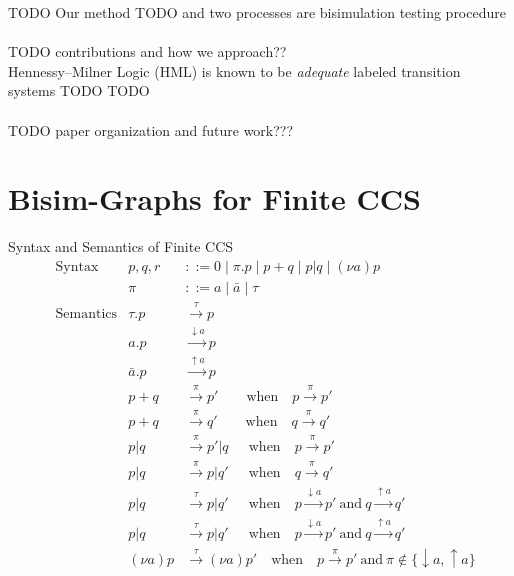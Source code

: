 \documentclass{llncs}
\begin{document}
TODO Our method TODO
and 
two processes are
bisimulation testing procedure


\paragraph{} TODO contributions and how we approach??\\
Hennessy--Milner Logic (HML) is known to be \emph{adequate}
labeled transition systems TODO TODO

\paragraph{} TODO paper organization and future work???

\section{Bisim-Graphs for Finite CCS} \label{sec:ccs}

Syntax and Semantics of Finite CCS
\begin{align*}
&\text{Syntax} &
p,q,r &::= 0 \mid \pi.p \mid p + q \mid p|q \mid (\nu a)p \\ &&
\pi &::= a \mid \bar{a} \mid \tau
\\
&\text{Semantics} &
\tau.p &\xrightarrow{\tau} p \\ &&
a.p &\xrightarrow{\downarrow a} p \\ &&
\bar{a}.p &\xrightarrow{\uparrow a} p \\ &&
p+q &\xrightarrow{\pi} p' \qquad\text{when}\quad p \xrightarrow{\pi} p' \\ &&
p+q &\xrightarrow{\pi} q' \qquad\text{when}\quad q \xrightarrow{\pi} q' \\ &&
p|q &\xrightarrow{\pi} p'|q ~~\quad\text{when}\quad p \xrightarrow{\pi} p' \\ &&
p|q &\xrightarrow{\pi} p|q' ~~\quad\text{when}\quad q \xrightarrow{\pi} q' \\ &&
p|q &\xrightarrow{\tau} p|q' ~~\quad\text{when}\quad
  p \xrightarrow{\downarrow a} p' ~\text{and}~
  q \xrightarrow{\uparrow a} q' \\ &&
p|q &\xrightarrow{\tau} p|q' ~~\quad\text{when}\quad
  p \xrightarrow{\downarrow a} p' ~\text{and}~
  q \xrightarrow{\uparrow a} q' \\ &&
(\nu a)p &\xrightarrow{\tau} (\nu a)p' \quad\text{when}\quad
  p \xrightarrow{\pi} p' ~\text{and}~ \pi \notin \{\downarrow a, \uparrow a\}
\end{align*}
\end{document}
